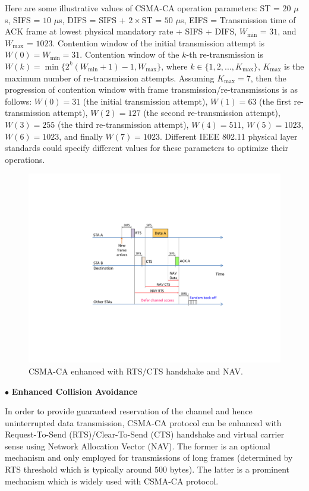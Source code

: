 \documentclass[journal,draftclsnofoot,12pt,onecolumn]{IEEEtran}
\begin{document}
Here are some illustrative values of CSMA-CA operation parameters: ST = $20$ $\mu$s, SIFS = $10$ $\mu$s, DIFS = SIFS + $2\times$ST = $50$ $\mu$s, EIFS = Transmission time of ACK frame at lowest physical mandatory rate + SIFS + DIFS, $W_{\min}$ = $31$, and $W_{\max}$ = $1023$. Contention window of the initial transmission attempt is $W(0)=W_{\min}=31$. Contention window of the $k$-th re-transmission is $W(k)=\min\{2^{k}(W_{\min}+1)-1, W_{\max}\}$, where $k \in \{1,2, ..., K_{\max}\}$, $K_{\max}$ is the maximum number of re-transmission attempts. Assuming $K_{\max}=7$, then the progression of contention window with frame transmission/re-transmissions is as follows: $W(0)=31$ (the initial transmission attempt), $W(1)=63$ (the first re-transmission attempt), $W(2)=127$ (the second re-transmission attempt), $W(3)=255$ (the third re-transmission attempt), $W(4)=511$, $W(5)=1023$, $W(6)=1023$, and finally $W(7)=1023$. Different IEEE 802.11 physical layer standards could specify different values for these parameters to optimize their operations.

\begin{figure}[!t]
\centering
\includegraphics[width=0.65\columnwidth]{figures2/802-11-RTS-CTS-NAV}
\caption{CSMA-CA enhanced with RTS/CTS handshake and NAV.}
\label{figs:802-11-RTS-CTS-NAV}
\end{figure}

\vspace{3mm}
\noindent $\bullet$ \textbf{Enhanced Collision Avoidance}
\vspace{3mm}

\noindent In order to provide guaranteed reservation of the channel and hence uninterrupted data transmission, CSMA-CA protocol can be enhanced with Request-To-Send (RTS)/Clear-To-Send (CTS) handshake and virtual carrier sense using Network Allocation Vector (NAV). The former is an optional mechanism and only employed for transmissions of long frames (determined by RTS threshold which is typically around $500$ bytes). The latter is a prominent mechanism which is widely used with CSMA-CA protocol.
\end{document}
